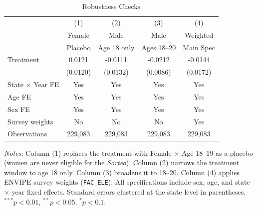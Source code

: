 \begin{table}[t]\begin{threeparttable}
\centering
\caption{Robustness Checks}
\label{tab:robustness}
\begin{tabular}{lcccc}
\hline\hline
 & (1) & (2) & (3) & (4) \\
 & Female & Male & Male & Weighted \\
 & Placebo & Age 18 only & Ages 18--20 & Main Spec \\
\hline
\addlinespace
Treatment & 0.0121 & -0.0111 & -0.0212 & -0.0144 \\
 & (0.0120) & (0.0132) & (0.0086) & (0.0172) \\
\addlinespace
State $\times$ Year FE & Yes & Yes & Yes & Yes \\
Age FE & Yes & Yes & Yes & Yes \\
Sex FE & Yes & Yes & Yes & Yes \\
Survey weights & No & No & No & Yes \\
\addlinespace
Observations & 229,083 & 229,083 & 229,083 & 229,083 \\
\hline\hline
\end{tabular}
\vspace{0.5em}\begin{tablenotes}[flushleft]
\small
\item \textit{Notes:} Column (1) replaces the treatment with Female $\times$ Age 18--19 as a placebo (women are never eligible for the \textit{Sorteo}). Column (2) narrows the treatment window to age 18 only. Column (3) broadens it to 18--20. Column (4) applies ENVIPE survey weights (\texttt{FAC\_ELE}). All specifications include sex, age, and state $\times$ year fixed effects. Standard errors clustered at the state level in parentheses. $^{***}p<0.01$, $^{**}p<0.05$, $^{*}p<0.1$.
\end{tablenotes}
\end{threeparttable}\end{table}

